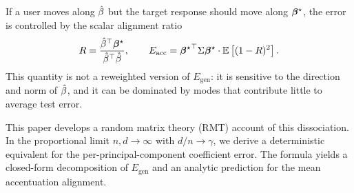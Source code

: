 \documentclass{article}
\theoremstyle{plain}
\theoremstyle{definition}
\begin{document}
If a user moves along $\hat{\beta}$ but the target response should move along $\boldsymbol{\beta}^{\star}$, the error is controlled by the scalar alignment ratio
\begin{equation}
    R=\frac{\hat{\beta}^\top\boldsymbol{\beta}^{\star}}{\hat{\beta}^\top\hat{\beta}},
    \qquad
    E_{\mathrm{acc}} = {\boldsymbol{\beta}^{\star}}^{\top}\Sigma\boldsymbol{\beta}^{\star} \cdot \mathbb{E}\left[(1-R)^2\right].
\end{equation}
This quantity is not a reweighted version of $E_{\mathrm{gen}}$: it is sensitive to the direction and norm of $\hat{\beta}$, and it can be dominated by modes that contribute little to average test error.

This paper develops a random matrix theory (RMT) account of this dissociation. In the proportional limit $n,d\to\infty$ with $d/n\to\gamma$, we derive a deterministic equivalent for the per-principal-component coefficient error. The formula yields a closed-form decomposition of $E_{\mathrm{gen}}$ and an analytic prediction for the mean accentuation alignment.




\clearpage
\end{document}
